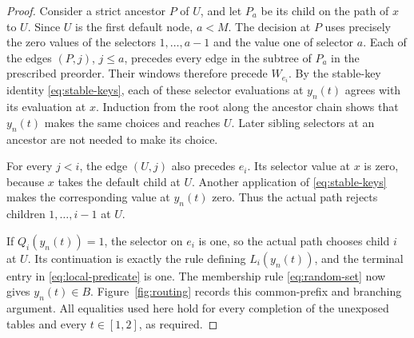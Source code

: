 \begin{proof}
Consider a strict ancestor \(P\) of \(U\), and let \(P_a\) be its
child on the path of \(x\) to \(U\).
Since \(U\) is the first default node, \(a<M\).
The decision at \(P\) uses precisely the zero values of the selectors
\(1,\ldots,a-1\) and the value one of selector \(a\).
Each of the edges \((P,j)\), \(j\le a\), precedes every edge in the
subtree of \(P_a\) in the prescribed preorder.
Their windows therefore precede \(W_{e_i}\).
By the stable-key identity \eqref{eq:stable-keys},
each of these selector evaluations at \(y_n(t)\) agrees with its
evaluation at \(x\).
Induction from the root along the ancestor chain shows that
\(y_n(t)\) makes the same choices and reaches \(U\).
Later sibling selectors at an ancestor are not needed to make its
choice.

For every \(j<i\), the edge \((U,j)\) also precedes \(e_i\).
Its selector value at \(x\) is zero, because \(x\) takes the default
child at \(U\).
Another application of \eqref{eq:stable-keys} makes the corresponding
value at \(y_n(t)\) zero.
Thus the actual path rejects children \(1,\ldots,i-1\) at \(U\).

If \(Q_i(y_n(t))=1\), the selector on \(e_i\) is one, so the actual
path chooses child \(i\) at \(U\).
Its continuation is exactly the rule defining \(L_i(y_n(t))\),
and the terminal entry in \eqref{eq:local-predicate} is one.
The membership rule \eqref{eq:random-set} now gives \(y_n(t)\in B\).
Figure~\ref{fig:routing} records this common-prefix and branching argument.
All equalities used here hold for every completion of the unexposed
tables and every \(t\in[1,2]\), as required.
\end{proof}



